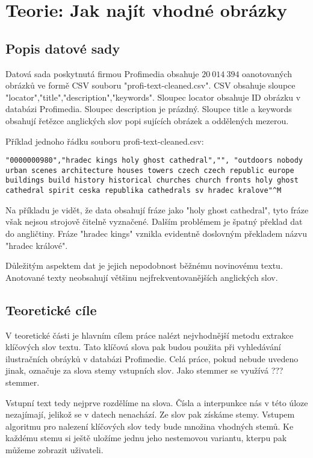 \chapter{Teorie: Jak najít vhodné obrázky}

\section{Popis datové sady}

Datová sada poskytnutá firmou Profimedia obsahuje $20\ 014\ 394$ oanotovaných obrázků ve formě CSV souboru "profi-text-cleaned.csv". CSV obsahuje sloupce "locator","title","description","keywords". Sloupec locator obsahuje ID obrázku v databázi Profimedia. Sloupec description je prázdný. Sloupce title a keywords obsahují řetězce anglických slov popi sujících obrázek a oddělených mezerou.

Příklad jednoho řádku souboru profi-text-cleaned.csv:

\lstset{breaklines=true, breakatwhitespace=true}


\begin{lstlisting}
"0000000980","hradec kings holy ghost cathedral","", "outdoors nobody urban scenes architecture houses towers czech czech republic europe buildings build history historical churches church fronts holy ghost cathedral spirit ceska republika cathedrals sv hradec kralove"^M
\end{lstlisting}

Na příkladu je vidět, že data obsahují fráze jako "holy ghost cathedral", tyto fráze však nejsou strojově čitelně vyznačené. Dalším problémem je špatný překlad dat do angličtiny. Fráze "hradec kings" vznikla evidentně doslovným překladem názvu "hradec králové".

Důležitým aspektem dat je jejich nepodobnost běžnému novinovému textu. Anotované texty neobsahují většinu nejfrekventovanějších anglických slov.

\section{Teoretické cíle}

V teoretické části je hlavním cílem práce nalézt nejvhodnější metodu extrakce klíčových slov textu. Tato klíčová slova pak budou použita při vyhledávání ilustračních obráyků v databázi Profimedie. Celá práce, pokud nebude uvedeno jinak, označuje za slova stemy vstupních slov. Jako stemmer se využívá ??? stemmer.

Vstupní text tedy nejprve rozdělíme na slova. Čísla a interpunkce nás v této úloze nezajímají, jelikož se v datech nenachází. Ze slov pak získáme stemy. Vstupem algoritmu pro nalezení klíčových slov tedy bude množina vhodných stemů. Ke každému stemu si ještě uložíme jednu jeho nestemovou variantu, kterpu pak můžeme zobrazit uživateli.

